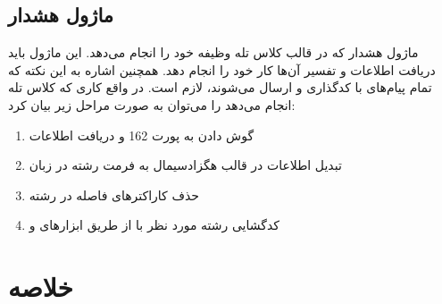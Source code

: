 \subsection{ماژول هشدار}

ماژول هشدار که در قالب کلاس تله وظیفه خود را انجام می‌دهد. این ماژول باید دریافت اطلاعات و تفسیر آن‌ها کار خود را انجام دهد. همچنین اشاره به این نکته که تمام پیام‌های  با  کدگذاری و ارسال می‌شوند، لازم است. در واقع کاری که کلاس تله انجام می‌دهد را می‌توان به صورت مراحل زیر بیان کرد:

\begin{enumerate}
    \item گوش دادن به پورت 162 و دریافت اطلاعات
    \item تبدیل اطلاعات در قالب هگزادسیمال به فرمت رشته در زبان 
    \item حذف کاراکترهای فاصله در رشته
    \item کدگشایی رشته مورد نظر با  از طریق ابزارهای  و 

\end{enumerate}


\section{خلاصه}

